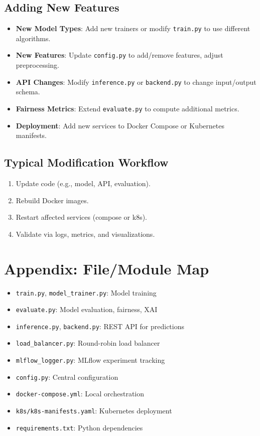 \documentclass[11pt]{article}
\begin{document}
\subsection{Adding New Features}
\begin{itemize}
  \item \textbf{New Model Types}: Add new trainers or modify \texttt{train.py} to use different algorithms.
  \item \textbf{New Features}: Update \texttt{config.py} to add/remove features, adjust preprocessing.
  \item \textbf{API Changes}: Modify \texttt{inference.py} or \texttt{backend.py} to change input/output schema.
  \item \textbf{Fairness Metrics}: Extend \texttt{evaluate.py} to compute additional metrics.
  \item \textbf{Deployment}: Add new services to Docker Compose or Kubernetes manifests.
\end{itemize}

\subsection{Typical Modification Workflow}
\begin{enumerate}
  \item Update code (e.g., model, API, evaluation).
  \item Rebuild Docker images.
  \item Restart affected services (compose or k8s).
  \item Validate via logs, metrics, and visualizations.
\end{enumerate}

\section{Appendix: File/Module Map}
\begin{itemize}
  \item \texttt{train.py}, \texttt{model_trainer.py}: Model training
  \item \texttt{evaluate.py}: Model evaluation, fairness, XAI
  \item \texttt{inference.py}, \texttt{backend.py}: REST API for predictions
  \item \texttt{load_balancer.py}: Round-robin load balancer
  \item \texttt{mlflow_logger.py}: MLflow experiment tracking
  \item \texttt{config.py}: Central configuration
  \item \texttt{docker-compose.yml}: Local orchestration
  \item \texttt{k8s/k8s-manifests.yaml}: Kubernetes deployment
  \item \texttt{requirements.txt}: Python dependencies
\end{itemize}
\end{document}
